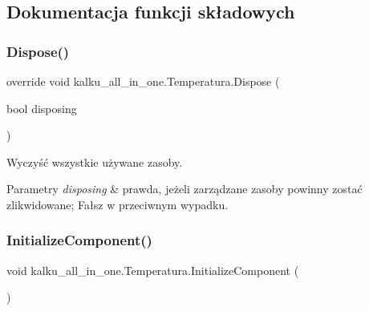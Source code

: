 \subsection{Dokumentacja funkcji składowych}
\mbox{\label{classkalku__all__in__one_1_1_temperatura_a8ee164b12547a890766e4a7c5f32c956}} 
\subsubsection{\texorpdfstring{Dispose()}{Dispose()}}
{\footnotesize\ttfamily override void kalku\+\_\+all\+\_\+in\+\_\+one.\+Temperatura.\+Dispose (\begin{DoxyParamCaption}\item[{bool}]{disposing }\end{DoxyParamCaption})\hspace{0.3cm}{\ttfamily [protected]}}



Wyczyść wszystkie używane zasoby. 


\begin{DoxyParams}{Parametry}
{\em disposing} & prawda, jeżeli zarządzane zasoby powinny zostać zlikwidowane; Fałsz w przeciwnym wypadku.\\
\hline
\end{DoxyParams}
\mbox{\label{classkalku__all__in__one_1_1_temperatura_ada295f106cae3110fbbd17ca1bb6506a}} 
\subsubsection{\texorpdfstring{InitializeComponent()}{InitializeComponent()}}
{\footnotesize\ttfamily void kalku\+\_\+all\+\_\+in\+\_\+one.\+Temperatura.\+Initialize\+Component (\begin{DoxyParamCaption}{ }\end{DoxyParamCaption})\hspace{0.3cm}{\ttfamily [private]}}




